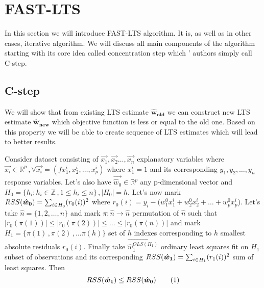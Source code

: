 \section{FAST-LTS} \label{section_fast_lts}
In this section we will introduce FAST-LTS algorithm\cite{rouss:2000}. 
It is, as well as in other cases, iterative algorithm. We will discuss all main components
of the algorithm starting with its core idea called concentration step which '
authors simply call C-step.


\subsection{C-step}
We will show that from existing LTS estimate $\boldsymbol{\hat{w}_{old}}$ we 
can construct new LTS estimate $\boldsymbol{\hat{w}_{new}}$ which objective 
function is less or equal to the old one. Based on this property we will be able 
to create sequence of LTS estimates which will lead to better results.




\begin{theorem}
Consider dataset consisting of
$\vec{x_1}, \vec{x_2} \ldots,\vec{x_n}$ explanatory variables where 
$\vec{x_i}\in\mathbb{R}^p\,, \forall \vec{x_i} = (fx^i_1, x^i_2,\ldots,x^i_p)$ where $x^i_1 = 1$
and its corresponding $y_1, y_2,\ldots,y_n$ response variables. 
Let's also have $\vec{\hat{w}_0}\in\mathbb{R}^p$ any p-dimensional vector and 
$H_0 = \{{h_i ; h_i \in\mathbb{Z}\,, 1 \leq h_i \leq n\}}\,, |H_0| = h$. 
Let's now mark $RSS(\boldsymbol{\hat{w}_0}) = \sum_{i\in H_0} (r_0(i))^2$ where 
$r_0(i) = y_i - (w_1^0x^i_1 + w_2^0x^i_2 +\ldots+ w_p^0x^i_p$).
Let's take $\hat{n} = \{{1,2,\ldots,n\}}$ and mark
$\pi: \hat{n} \rightarrow \hat{n}$ permutation of $\hat{n}$ such that $|r_0({\pi(1)})| \leq |r_0({\pi(2)})| \leq \ldots \leq |r_0({\pi(n)})|$
and mark $H_1 = \{{\pi(1)\,, \pi(2)\,,... \pi(h)\}}$ set of $h$ indexes corresponding to $h$ smallest absolute residuals $r_0(i)$.
Finally take $\vec{\hat{w}^{OLS(H_1)}_1 }$ ordinary least squares fit on $H_1$ subset of observations
and its corresponding $RSS(\boldsymbol{\hat{w}_1}) = \sum_{i\in H_1} (r_1(i))^2$ sum of least squares. Then
\[ 
	RSS(\what{1}) \leq RSS(\what{0}) \numberthis
\]
\end{theorem}

